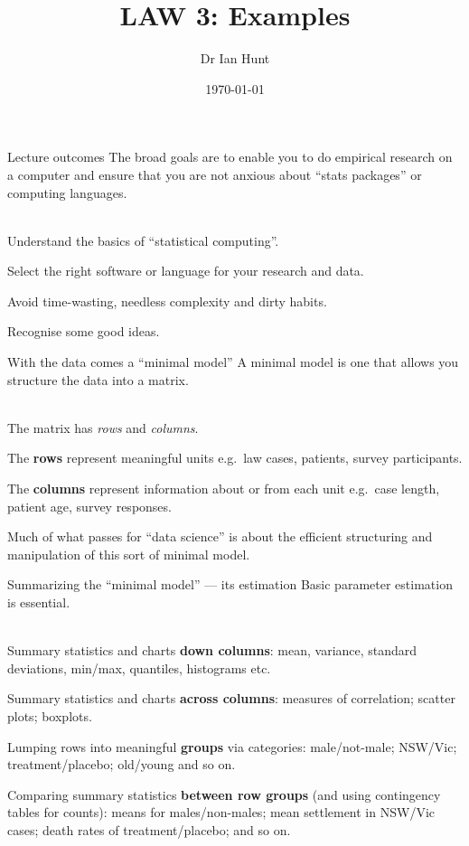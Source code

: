 \documentclass{beamer}
\title{LAW 3: Examples}
\date{\today}
\author[Dr Ian Hunt] %
{Dr Ian Hunt\inst{1}}
\institute[Monash University] %
{
	\inst{1}%
	Manager, Statistical Consulting Service\\Data Science and AI Platform\\
	Monash University\\
	ihunt@bunhill.co.uk; ian.hunt@monash.edu; statisticalconsulting@monash.edu
}
\theoremstyle{example}
\newenvironment{bigitemize}{\itemize\addtolength{\itemsep}{1em}}{\enditemize}
\newenvironment{bigenumerate}{\enumerate\addtolength{\itemsep}{1em}}{\endenumerate}
\newcommand{\outcomes}{	The broad goals are to enable you to do empirical research on a computer and ensure that you are not anxious about ``stats packages'' or computing languages.
	\\~\\
	\begin{bigenumerate}
		\item<+-> Understand the basics of ``statistical computing''.
		\item<+-> Select the right software or language for your research and data.
		\item<+-> Avoid time-wasting, needless complexity and dirty habits.
		\item<+-> Recognise some good ideas.
	\end{bigenumerate}
}
\begin{document}
	
	
	\frame{\titlepage}
	
	\begin{frame}
		\tableofcontents[hideallsubsections]
	\end{frame}
	
	
	\begin{frame}{Lecture outcomes}
		\outcomes
	\end{frame}
	
	
	
	
	\begin{frame}{With the data comes a ``minimal model''}
		A minimal model is one that allows you structure the data into a matrix.\\~\\
		\begin{bigitemize}
			\item<+-> The matrix has \emph{rows} and \emph{columns}.
			
			\item<+-> The \textbf{rows} represent meaningful units e.g.\ law cases, patients, survey participants.
			
			\item <+-> The \textbf{columns} represent information about or from each unit e.g.\ case length, patient age, survey responses.
			
			\item<+-> Much of what passes for ``data science'' is about the efficient structuring and manipulation of this sort of minimal model.
			
		\end{bigitemize}
	\end{frame}
	
	
	\begin{frame}{Summarizing the ``minimal model'' --- its estimation}
		Basic parameter estimation is essential.\\~\\
		\begin{bigitemize}
			\item<+-> Summary statistics  and charts \textbf{down columns}: mean, variance, standard deviations, min/max, quantiles, histograms etc.
			
			\item<+-> Summary statistics and charts \textbf{across columns}: measures of correlation; scatter plots; boxplots.
			
			\item<+-> Lumping rows into meaningful \textbf{groups} via categories: male/not-male; NSW/Vic; treatment/placebo; old/young and so on.
			
			\item<+-> Comparing summary statistics \textbf{between row groups} (and using contingency tables for counts): means for males/non-males; mean settlement in NSW/Vic cases; death rates of treatment/placebo; and so on.
			
		\end{bigitemize}
	\end{frame}
	
\end{document}
